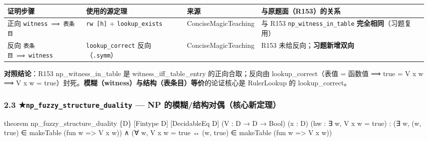 \documentclass[
]{article}
\newenvironment{Shaded}{}{}
\newcommand{\NormalTok}[1]{#1}
\newcounter{none} %
\begin{document}
{\def\LTcaptype{none} %
\begin{longtable}[]{@{}
 >{\raggedright\arraybackslash}p{}
 >{\raggedright\arraybackslash}p{}
 >{\raggedright\arraybackslash}p{}
 >{\raggedright\arraybackslash}p{}@{}}
\toprule\noalign{}
\begin{minipage}[b]{\linewidth}\raggedright
证明步骤
\end{minipage} & \begin{minipage}[b]{\linewidth}\raggedright
使用的源定理
\end{minipage} & \begin{minipage}[b]{\linewidth}\raggedright
来源
\end{minipage} & \begin{minipage}[b]{\linewidth}\raggedright
与原题面（R153）的关系
\end{minipage} \\
\midrule\noalign{}
\endhead
\bottomrule\noalign{}
\endlastfoot
正向 \texttt{witness\ ⟹\ 表条目} & \texttt{rw\ {[}h{]}} +
\texttt{lookup\_exists} & ConciseMagicTeaching & 与 R153
\texttt{np\_witness\_in\_table} \textbf{完全相同}（习题复用） \\
反向 \texttt{表条目\ ⟹\ witness} & \texttt{lookup\_correct}
反向（\texttt{.symm}） & ConciseMagicTeaching & R153
未给反向；\textbf{习题新增双向} \\
\end{longtable}
}

\textbf{对照结论}：R153 np\_witness\_in\_table 是
witness\_iff\_table\_entry 的正向合取；反向由 lookup\_correct（表值 =
函数值 ⟹ true = V x w ⟹ V x w =
true）封死。\textbf{模糊（witness）与结构（表条目）等价}的论证核心是
RulerLookup 的 lookup\_correct。

\subsubsection{\texorpdfstring{2.3
★\texttt{np\_fuzzy\_structure\_duality} --- NP
的模糊/结构对偶（核心新定理）}{2.3 ★np\_fuzzy\_structure\_duality --- NP 的模糊/结构对偶（核心新定理）}}\label{np_fuzzy_structure_duality-np-ux7684ux6a21ux7ccaux7ed3ux6784ux5bf9ux5076ux6838ux5fc3ux65b0ux5b9aux7406}

\begin{Shaded}
\begin{Highlighting}[]
\NormalTok{theorem np\_fuzzy\_structure\_duality \{D\} [Fintype D] [DecidableEq D]}
\NormalTok{ (V : D → D → Bool) (x : D) (hw : ∃ w, V x w = true) :}
\NormalTok{ (∃ w, (w, true) ∈ makeTable (fun w =\textgreater{} V x w)) ∧}
\NormalTok{ (∀ w, V x w = true ↔ (w, true) ∈ makeTable (fun w =\textgreater{} V x w))}
\end{Highlighting}
\end{Shaded}
\end{document}
